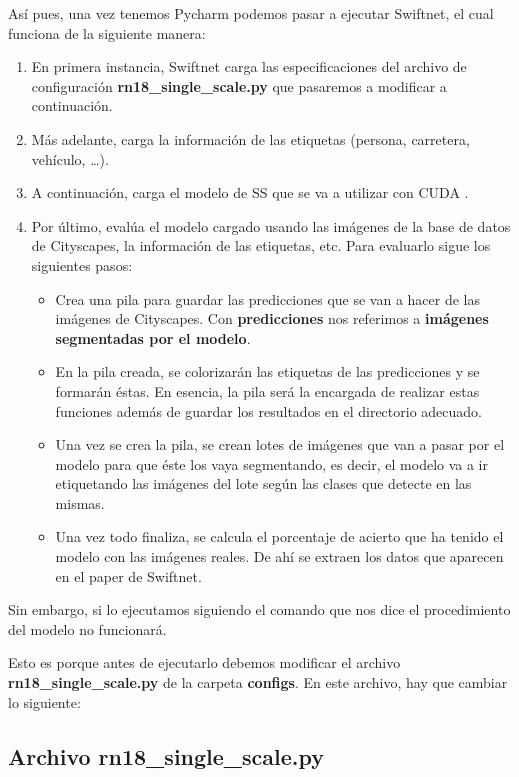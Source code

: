 Así pues, una vez tenemos Pycharm podemos pasar a ejecutar Swiftnet, el cual funciona de la siguiente manera:

\begin{enumerate}
\item En primera instancia, Swiftnet carga las especificaciones del archivo de configuración \textbf{rn18\_single\_scale.py} que pasaremos a modificar a continuación.
\item Más adelante, carga la información de las etiquetas (persona, carretera, vehículo, \ldots).
\item A continuación, carga el modelo de \ac{SS} que se va a utilizar con CUDA \cite{cuda}.
\item Por último, evalúa el modelo cargado usando las imágenes de la base de datos de Cityscapes, la información de las etiquetas, etc. Para evaluarlo sigue los siguientes pasos:

\begin{itemize}
\item Crea una pila para guardar las predicciones que se van a hacer de las imágenes de Cityscapes. Con \textbf{predicciones} nos referimos a \textbf{imágenes segmentadas por el modelo}.
\item En la pila creada, se colorizarán las etiquetas de las predicciones y se formarán éstas. En esencia, la pila será la encargada de realizar estas funciones además de guardar los resultados en el directorio adecuado.
\item Una vez se crea la pila, se crean lotes de imágenes que van a pasar por el modelo para que éste los vaya segmentando, es decir, el modelo va a ir etiquetando las imágenes del lote según las clases que detecte en las mismas.
\item Una vez todo finaliza, se calcula el porcentaje de acierto que ha tenido el modelo con las imágenes reales. De ahí se extraen los datos que aparecen en el paper de Swiftnet.
\end{itemize}   
\end{enumerate}
Sin embargo, si lo ejecutamos siguiendo el comando que nos dice el procedimiento del modelo no funcionará.

Esto es porque antes de ejecutarlo debemos modificar el archivo \textbf{rn18\_single\_scale.py} de la carpeta \textbf{configs}. En este archivo, hay que cambiar lo siguiente:

\subsection{Archivo rn18\_single\_scale.py}

